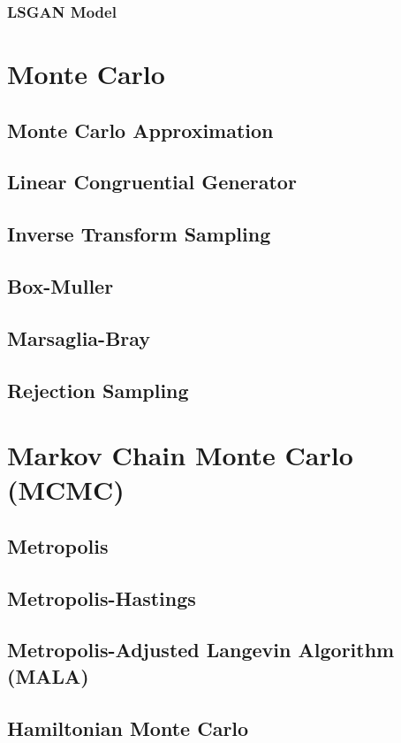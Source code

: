 \documentclass{article}
\begin{document}
\subsubsection{LSGAN Model}


\section{Monte Carlo}
\subsection{Monte Carlo Approximation}
\subsection{Linear Congruential Generator}
\subsection{Inverse Transform Sampling}
\subsection{Box-Muller}
\subsection{Marsaglia-Bray}
\subsection{Rejection Sampling}

\section{Markov Chain Monte Carlo (MCMC)}
\subsection{Metropolis}
\subsection{Metropolis-Hastings}
\subsection{Metropolis-Adjusted Langevin Algorithm (MALA)}
\subsection{Hamiltonian Monte Carlo}







% 
% 
\end{document}
